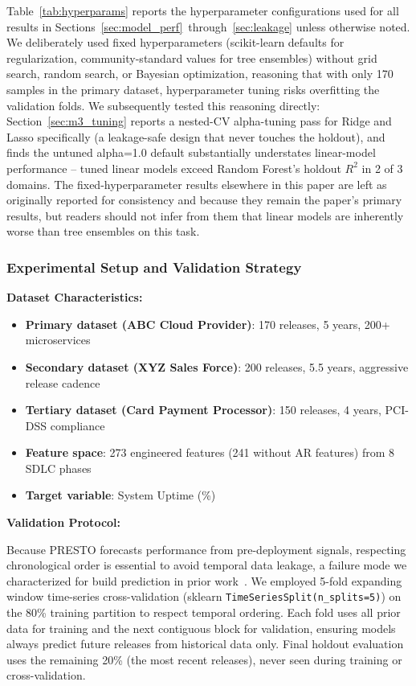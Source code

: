 \documentclass[technologies,article,submit,pdftex,moreauthors]{Definitions/mdpi}
\begin{document}
Table~\ref{tab:hyperparams} reports the hyperparameter
configurations used for all results in
Sections~\ref{sec:model_perf}~through~\ref{sec:leakage} unless
otherwise noted. We deliberately used fixed hyperparameters
(scikit-learn defaults for regularization, community-standard values for
tree ensembles) without grid search, random search, or Bayesian
optimization, reasoning that with only 170 samples in the primary
dataset, hyperparameter tuning risks overfitting the validation folds.
We subsequently tested this reasoning directly: Section~\ref{sec:m3_tuning} reports a
nested-CV alpha-tuning pass for Ridge and Lasso specifically (a
leakage-safe design that never touches the holdout), and finds the
untuned alpha=1.0 default substantially understates linear-model
performance -- tuned linear models exceed Random Forest's holdout
\(R^2\) in 2 of 3 domains. The fixed-hyperparameter results elsewhere in
this paper are left as originally reported for consistency and because
they remain the paper's primary results, but readers should not infer
from them that linear models are inherently worse than tree ensembles on
this task.

\subsubsection{Experimental Setup and Validation
Strategy}\label{sec:exp_setup_validation}

\textbf{Dataset Characteristics:}

\begin{itemize}
\item
  \textbf{Primary dataset (ABC Cloud Provider)}: 170 releases, 5 years,
  200+ microservices
\item
  \textbf{Secondary dataset (XYZ Sales Force)}: 200 releases, 5.5 years,
  aggressive release cadence
\item
  \textbf{Tertiary dataset (Card Payment Processor)}: 150 releases, 4
  years, PCI-DSS compliance
\item
  \textbf{Feature space}: 273 engineered features (241 without AR
  features) from 8 SDLC phases
\item
  \textbf{Target variable}: System Uptime (\%)
\end{itemize}

\textbf{Validation Protocol:}

Because PRESTO forecasts performance from pre-deployment signals,
respecting chronological order is essential to avoid temporal data
leakage, a failure mode we characterized for build prediction in prior
work~\cite{mishra2026leakage}. We employed 5-fold expanding window
time-series cross-validation (sklearn
\texttt{TimeSeriesSplit(n\_\allowbreak splits=5)}) on the 80\% training partition to
respect temporal ordering. Each fold uses all prior data for training
and the next contiguous block for validation, ensuring models always
predict future releases from historical data only. Final holdout
evaluation uses the remaining 20\% (the most recent releases), never
seen during training or cross-validation.
\end{document}
